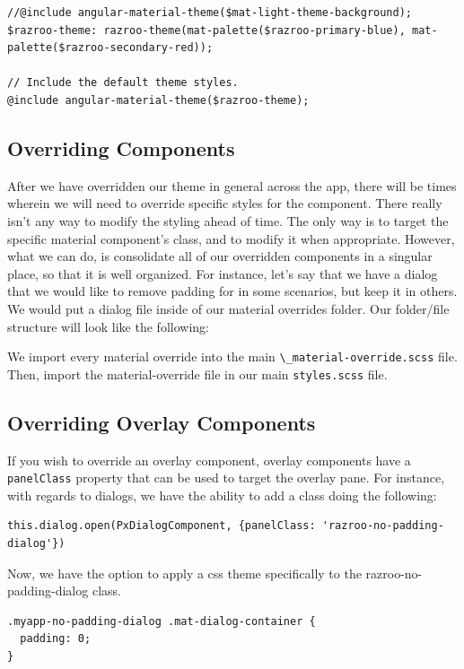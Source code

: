 \begin{lstlisting}[caption=html and body override]
//@include angular-material-theme($mat-light-theme-background);
$razroo-theme: razroo-theme(mat-palette($razroo-primary-blue), mat-palette($razroo-secondary-red));

// Include the default theme styles.
@include angular-material-theme($razroo-theme);  
\end{lstlisting}

\subsection{Overriding Components}
After we have overridden our theme in general across the app, there will be 
times wherein we will need to override specific styles for the component. 
There really isn't any way to modify the styling ahead of time. The only way
is to target the specific material component's class, and to modify it when 
appropriate. However, what we can do, is consolidate all of our overridden
components in a singular place, so that it is well organized. For instance, 
let's say that we have a dialog that we would like to remove padding for 
in some scenarios, but keep it in others. We would put a dialog file inside of
our material overrides folder. Our folder/file structure will look like the
following: 



We import every material override into the main 
\lstinline{\_material-override.scss} file. Then, import the material-override 
file in our main \lstinline{styles.scss} file. 

\subsection{Overriding Overlay Components}
If you wish to override an overlay component, overlay components have a 
\lstinline{panelClass} property that can be used to target the overlay pane. 
For instance, with regards to dialogs, we have the ability to add a class doing
the following: 
\begin{lstlisting}
this.dialog.open(PxDialogComponent, {panelClass: 'razroo-no-padding-dialog'}) 
\end{lstlisting}

Now, we have the option to apply a css theme specifically to the 
razroo-no-padding-dialog class. 

\begin{lstlisting}
.myapp-no-padding-dialog .mat-dialog-container {
  padding: 0;
}
\end{lstlisting}

